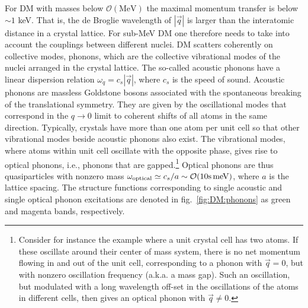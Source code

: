  For DM with masses below ${\mathcal O}(\text{MeV})$ the maximal momentum transfer is below $\sim 1 $ keV. That is, the de Broglie wavelength of $|\vec q|$ is larger than the interatomic distance in a crystal lattice. For sub-MeV DM one therefore needs to take into account the couplings between different nuclei. DM scatters coherently on collective modes, phonons, which are  the collective vibrational modes of the nuclei arranged in the crystal lattice. The so-called acoustic phonons have a linear dispersion relation $\omega_q=c_s |\vec q|$, where $c_s$ is the speed of sound. Acoustic phonons are massless Goldstone bosons associated with the spontaneous breaking of the translational symmetry. They are given by the oscillational modes that correspond in the $q\to 0$ limit to coherent shifts of all atoms in the same direction. Typically, crystals have more than one atom per unit cell so that other vibrational modes beside acoustic phonons  also exist. 
 The vibrational modes, where atoms within unit cell oscillate with the opposite phase, gives rise to optical phonons, i.e., phonons that are gapped.\footnote{Consider for instance the example where a unit crystal cell has two atoms. If these oscillate around their center of mass system, there is no net momentum flowing in and out of the unit cell, corresponding to a phonon with $\vec q=0$, but with nonzero oscillation frequency (a.k.a. a mass gap). Such an oscillation, but modulated with a long wavelength off-set in the oscillations of the atoms in different cells, then gives an optical phonon with $\vec q\ne0$.}   Optical phonons are thus quasiparticles with nonzero mass $\omega_{\rm optical}\simeq c_s/a \sim {\mathcal O}(10\text{s}\, \text{meV})$, where $a$ is the lattice spacing. The structure functions corresponding to single acoustic and single optical phonon excitations are denoted in fig.~\ref{fig:DM:phonons} as green and magenta bands, respectively.

